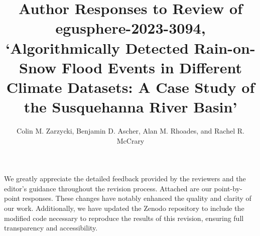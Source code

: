 \documentclass{article}
\begin{document}
\title{Author Responses to Review of egusphere-2023-3094, `Algorithmically Detected Rain-on-Snow Flood Events in Different Climate Datasets: A Case Study of the Susquehanna River Basin'}
\author{Colin M. Zarzycki, Benjamin D. Ascher, Alan M. Rhoades, and Rachel R. McCrary}

\maketitle
{}

We greatly appreciate the detailed feedback provided by the reviewers and the editor's guidance throughout the revision process. Attached are our point-by-point responses. These changes have notably enhanced the quality and clarity of our work. Additionally, we have updated the Zenodo repository to include the modified code necessary to reproduce the results of this revision, ensuring full transparency and accessibility.
\end{document}
